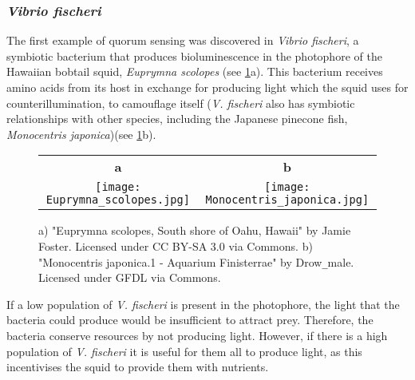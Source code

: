 \subsubsection{\textit{Vibrio fischeri}}

The first example of quorum sensing was discovered in \textit{Vibrio fischeri}, a symbiotic bacterium that produces bioluminescence in the photophore of the Hawaiian bobtail squid, \textit{Euprymna scolopes} \cite{Nealson1970a,Miller2001,Visick2006} (see \ref{fig:ES+MJ}a). This bacterium receives amino acids\cite{Graf1998, Lemus2000} from its host in exchange for producing light which the squid uses for counterillumination, to camouflage itself\cite{Jones2004} (\textit{V. fischeri} also has symbiotic relationships with other species, including the Japanese pinecone fish, \textit{Monocentris japonica}\cite{Ruby1976})(see \ref{fig:ES+MJ}b). 

\begin{figure}[H]
	\begin{center}
		\begin{tabular}{cc}
	    	\textbf{a} & \textbf{b}\\
			\texttt{[image: Euprymna\_scolopes.jpg]} & \texttt{[image: Monocentris\_japonica.jpg]} \\
			
		\end{tabular}	
		
		\caption{a) "Euprymna scolopes, South shore of Oahu, Hawaii" by Jamie Foster. Licensed under CC BY-SA 3.0 via Commons. 
		b) "Monocentris japonica.1 - Aquarium Finisterrae" by Drow\texttt{\_}male. Licensed under GFDL via Commons. \label{fig:ES+MJ}}
		
	\end{center}
\end{figure}


If a low population  of \textit{V. fischeri} is  present  in  the  photophore,  the  light  that the bacteria could produce would  be insufficient to  attract prey. Therefore, the bacteria conserve resources by not producing light.
However, if there is a high population of \textit{V. fischeri} it is useful for them all to produce light, as this incentivises the squid to provide them with nutrients. 


